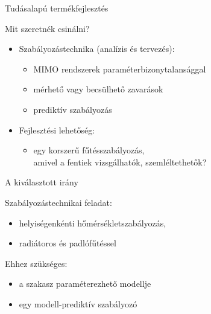 \documentclass[14pt,handout]{beamer}
\begin{document}
\begin{frame}{Tudásalapú termékfejlesztés}

Mit szeretnék csinálni?
\pause
\vspace{6pt}

\begin{itemize}
	\setlength{\itemsep}{12pt}
	\item Szabályozástechnika (analízis és tervezés):
	\begin{itemize}
		\item MIMO rendszerek paraméterbizonytalansággal
		\item mérhető vagy becsülhető zavarások
		\item prediktív szabályozás
	\end{itemize}
	\pause

	\item Fejlesztési lehetőség:
	\begin{itemize}
		\item egy korszerű fűtésszabályozás, \\
		amivel a fentiek vizsgálhatók, szemléltethetők?
	\end{itemize}
\end{itemize}
\end{frame}

\begin{frame}{A kiválasztott irány}

Szabályozástechnikai feladat:

\begin{itemize}
	\item helyiségenkénti hőmérsékletszabályozás,
	\item radiátoros és padlófűtéssel
\end{itemize}
\vspace{6pt}

Ehhez szükséges:


\begin{itemize}
	\item a szakasz paraméterezhető modellje
	\item egy modell-prediktív szabályozó
\end{itemize}


\end{frame}
\end{document}
